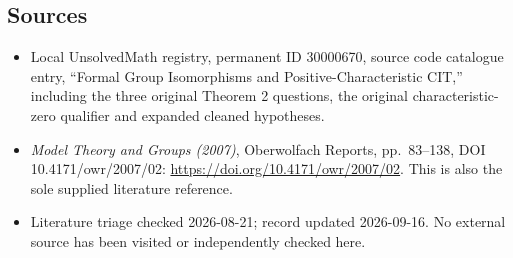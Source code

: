 \documentclass[11pt]{article}
\begin{document}
\subsection{Sources}
\begin{itemize}
\item Local UnsolvedMath registry, permanent ID 30000670, source code catalogue entry, ``Formal Group Isomorphisms and Positive-Characteristic CIT,'' including the three original Theorem 2 questions, the original characteristic-zero qualifier and expanded cleaned hypotheses.
\item \emph{Model Theory and Groups (2007)}, Oberwolfach Reports, pp.\ 83--138, DOI 10.4171/owr/2007/02: \url{https://doi.org/10.4171/owr/2007/02}. This is also the sole supplied literature reference.
\item Literature triage checked 2026-08-21; record updated 2026-09-16. No external source has been visited or independently checked here.
\end{itemize}
\end{document}
